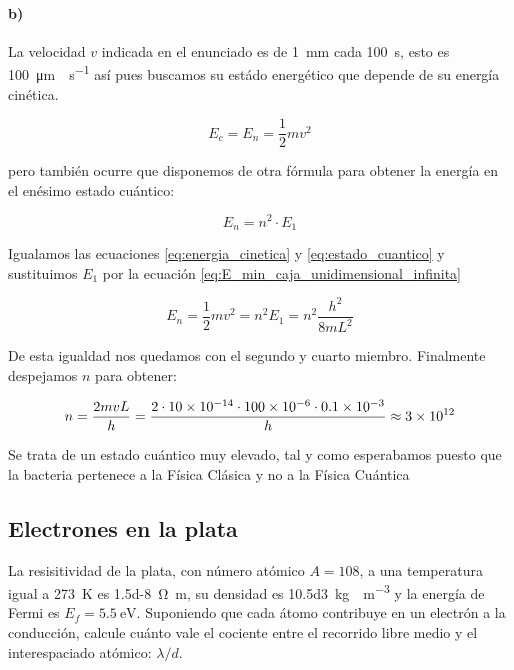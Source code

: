 \documentclass[12pt, a4paper]{article}
\begin{document}
        \paragraph{b)} La velocidad $v$ indicada en el enunciado es de \SI{1}{\milli\meter} cada \SI{100}{\second}, esto
        es \SI{100}{\micro\meter\cdot\second^{-1}} así pues buscamos su estádo energético que depende de su energía cinética.

        \begin{equation} \label{eq:energia_cinetica}
            E_c = E_n = \frac{1}{2}mv^2
        \end{equation}

        pero también ocurre que disponemos de otra fórmula para
        obtener la energía en el enésimo estado cuántico:

        \begin{equation}    \label{eq:estado_cuantico}
            E_n = n^2 \cdot E_1
        \end{equation}

        Igualamos las ecuaciones \ref{eq:energia_cinetica} y \ref{eq:estado_cuantico} y
        sustituimos $E_1$ por la ecuación \ref{eq:E_min_caja_unidimensional_infinita}

        \begin{equation*}
            E_n = \frac{1}{2}mv^2 = n^2 E_1 = n^2 \frac{h^2}{8mL^2}
        \end{equation*}

        De esta igualdad nos quedamos con el segundo y cuarto miembro.
        Finalmente despejamos $n$ para obtener:

        \begin{equation}
            n = \frac{2mvL}{h} = \frac{\num{2}\cdot\num{10d-14}\cdot\num{100d-6}\cdot\num{0.1d-3}}{h} \approx \num{3d12}
        \end{equation}

        Se trata de un estado cuántico muy elevado, tal y como esperabamos puesto que la bacteria pertenece a la
        Física Clásica y no a la Física Cuántica





        \subsection{Electrones en la plata}
        La resisitividad de la plata, con número atómico $A=\num{108}$, a una temperatura igual
        a \SI{273}{\kelvin} es \SI{1.5d-8}{\ohm\meter}, su densidad es \SI{10.5d3}{\kilo\gram\cdot\meter^{-3}}
        y la energía de Fermi es $E_f = \SI{5.5}{\electronvolt}$. Suponiendo que cada átomo contribuye
        en un electrón a la conducción, calcule cuánto vale el cociente entre el recorrido libre medio
        y el interespaciado atómico: $\lambda/d$.
\end{document}
